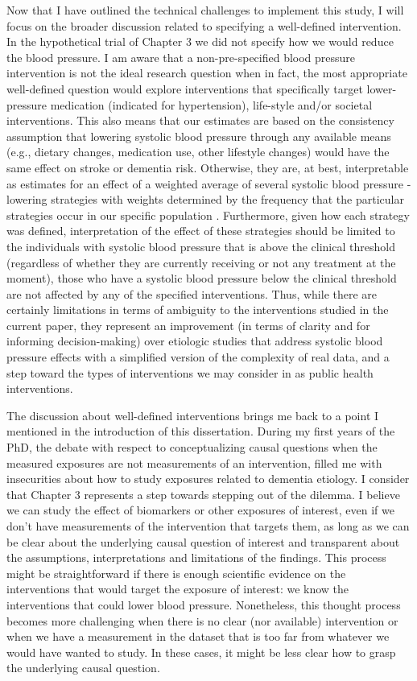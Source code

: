 \documentclass[
]{book}
\begin{document}
Now that I have outlined the technical challenges to implement this study, I will focus on the broader discussion related to specifying a well-defined intervention. In the hypothetical trial of Chapter 3 we did not specify how we would reduce the blood pressure. I am aware that a non-pre-specified blood pressure intervention is not the ideal research question when in fact, the most appropriate well-defined question would explore interventions that specifically target lower-pressure medication (indicated for hypertension), life-style and/or societal interventions. This also means that our estimates are based on the consistency assumption that lowering systolic blood pressure through any available means (e.g., dietary changes, medication use, other lifestyle changes) would have the same effect on stroke or dementia risk. Otherwise, they are, at best, interpretable as estimates for an effect of a weighted average of several systolic blood pressure - lowering strategies with weights determined by the frequency that the particular strategies occur in our specific population \autocite{waterkills,hernan2011}. Furthermore, given how each strategy was defined, interpretation of the effect of these strategies should be limited to the individuals with systolic blood pressure that is above the clinical threshold (regardless of whether they are currently receiving or not any treatment at the moment), those who have a systolic blood pressure below the clinical threshold are not affected by any of the specified interventions. Thus, while there are certainly limitations in terms of ambiguity to the interventions studied in the current paper, they represent an improvement (in terms of clarity and for informing decision-making) over etiologic studies that address systolic blood pressure effects with a simplified version of the complexity of real data, and a step toward the types of interventions we may consider in as public health interventions.

The discussion about well-defined interventions brings me back to a point I mentioned in the introduction of this dissertation. During my first years of the PhD, the debate with respect to conceptualizing causal questions when the measured exposures are not measurements of an intervention, filled me with insecurities about how to study exposures related to dementia etiology. I consider that Chapter 3 represents a step towards stepping out of the dilemma. I believe we can study the effect of biomarkers or other exposures of interest, even if we don't have measurements of the intervention that targets them, as long as we can be clear about the underlying causal question of interest and transparent about the assumptions, interpretations and limitations of the findings. This process might be straightforward if there is enough scientific evidence on the interventions that would target the exposure of interest: we know the interventions that could lower blood pressure. Nonetheless, this thought process becomes more challenging when there is no clear (nor available) intervention or when we have a measurement in the dataset that is too far from whatever we would have wanted to study. In these cases, it might be less clear how to grasp the underlying causal question.
\end{document}
